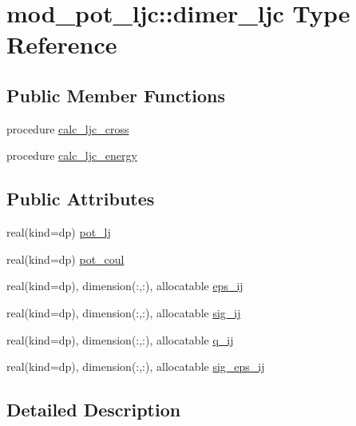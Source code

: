 \hypertarget{structmod__pot__ljc_1_1dimer__ljc}{}\section{mod\+\_\+pot\+\_\+ljc\+:\+:dimer\+\_\+ljc Type Reference}
\label{structmod__pot__ljc_1_1dimer__ljc}
\subsection*{Public Member Functions}
\begin{DoxyCompactItemize}
\item 
procedure \hyperlink{structmod__pot__ljc_1_1dimer__ljc_a72bbaa1bb85f42ccaf1907a3b7078d6e}{calc\+\_\+ljc\+\_\+cross}
\item 
procedure \hyperlink{structmod__pot__ljc_1_1dimer__ljc_a38cbfad004776de1ca29fa902aa5e26b}{calc\+\_\+ljc\+\_\+energy}
\end{DoxyCompactItemize}
\subsection*{Public Attributes}
\begin{DoxyCompactItemize}
\item 
real(kind=dp) \hyperlink{structmod__pot__ljc_1_1dimer__ljc_aebc58106f2ca84012cc909153736ade3}{pot\+\_\+lj}
\item 
real(kind=dp) \hyperlink{structmod__pot__ljc_1_1dimer__ljc_ae8cfe31b601f19d7fec86f87c79669b1}{pot\+\_\+coul}
\item 
real(kind=dp), dimension(\+:,\+:), allocatable \hyperlink{structmod__pot__ljc_1_1dimer__ljc_a0b8a2e1fcfdad2b20d94cf2ff7bf403b}{eps\+\_\+ij}
\item 
real(kind=dp), dimension(\+:,\+:), allocatable \hyperlink{structmod__pot__ljc_1_1dimer__ljc_acfee344761569c6861c21cb329e7a312}{sig\+\_\+ij}
\item 
real(kind=dp), dimension(\+:,\+:), allocatable \hyperlink{structmod__pot__ljc_1_1dimer__ljc_a92979f65abc0895fcaa532667db38fb6}{q\+\_\+ij}
\item 
real(kind=dp), dimension(\+:,\+:), allocatable \hyperlink{structmod__pot__ljc_1_1dimer__ljc_aeecdcee92d0a969cf85874052a81872d}{sig\+\_\+eps\+\_\+ij}
\end{DoxyCompactItemize}


\subsection{Detailed Description}


